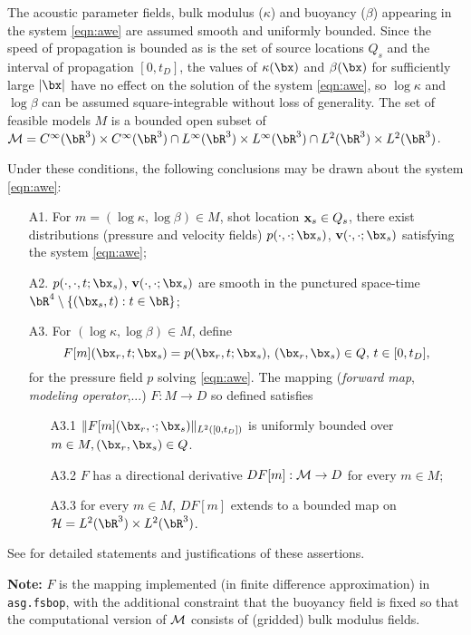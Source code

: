 The acoustic parameter fields, bulk modulus ($\kappa$) and buoyancy ($\beta$) appearing in the system \ref{eqn:awe} are assumed smooth and uniformly bounded.
Since the speed of propagation is bounded as is the set of source locations $Q_s$ and the interval of propagation $[0,t_D]$, the values of $\kappa(\bx)$ and $\beta(\bx)$ for sufficiently large $|\bx|$ have no effect on the solution of the system \ref{eqn:awe}, so $\log \kappa$ and $\log \beta$ can be assumed square-integrable without loss of generality. The set of feasible models $M$ is a  bounded open subset of ${\cal M} = C^{\infty}(\bR^3) \times C^{\infty}(\bR^3) \cap L^{\infty}(\bR^3) \times L^{\infty}(\bR^3) \cap L^2(\bR^3) \times L^2(\bR^3)$.

Under these conditions, the following conclusions may be drawn about the system \ref{eqn:awe}:
\begin{itemize}
  \item[A1. ] For $m = (\log \kappa, \log \beta) \in M$, shot location ${\bf x}_s\in Q_s$, there exist distributions (pressure and velocity fields) $p(\cdot,\cdot;\bx_s)$, ${\bf v}(\cdot,\cdot;\bx_s)$ satisfying the system \ref{eqn:awe};
  \item[A2. ] $p(\cdot,\cdot,t;\bx_s)$, ${\bf v}(\cdot,\cdot;\bx_s)$ are smooth in the punctured space-time $\bR^4 \setminus \{(\bx_s,t): t \in \bR\}$;
    \item[A3. ] For $(\log \kappa, \log \beta) \in M$, define 
\[
  F[m](\bx_r,t;\bx_s) = p(\bx_r,t;\bx_s), \, (\bx_r,\bx_s) \in Q, \, t \in [0,t_D],
\]
for the pressure field $p$ solving \ref{eqn:awe}. The mapping ({\em forward map}, {\em modeling operator},...) $F: M \rightarrow D$ so defined satisfies
\begin{itemize}
  \item[A3.1 ] $\|F[m](\bx_r,\cdot;\bx_s)\|_{L^2([0,t_D])}$ is uniformly bounded over $m \in M, (\bx_r,\bx_s) \in Q$.
  \item[A3.2 ] $F$ has a directional derivative $DF[m]: {\cal M} \rightarrow D$ for every $m \in M$;
  \item[A3.3 ] for every $m \in M$, $DF[m]$ extends to a bounded map on ${\cal H} = L^2(\bR^3) \times L^2(\bR^3)$.
  \end{itemize}
\end{itemize}
See \cite{Symes:23a} for detailed statements and justifications of these assertions.

{\bf Note:}
$F$ is the mapping implemented (in finite difference approximation) in {\tt asg.fsbop}, with the additional constraint that the buoyancy field is fixed so that the computational version of ${\cal M}$ consists of (gridded) bulk modulus fields.

